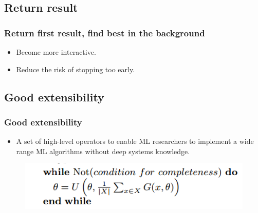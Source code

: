 \subsection{Return result}
\begin{frame}
    \frametitle{Return first result, find best in the background}
	\begin{itemize}
		\item Become more interactive. 
		\item Reduce the risk of stopping too early.  
	\end{itemize} 
\end{frame}

\subsection{Good extensibility}
\begin{frame}
    \frametitle{Good extensibility}
	\begin{itemize}
		\item A set of high-level operators to enable ML researchers to implement a wide range ML algorithms without deep systems knowledge. 
	\end{itemize} 
    \begin{figure}
		\includegraphics[scale=0.4]{figure/gdex.png}
	\end{figure}
\end{frame}
